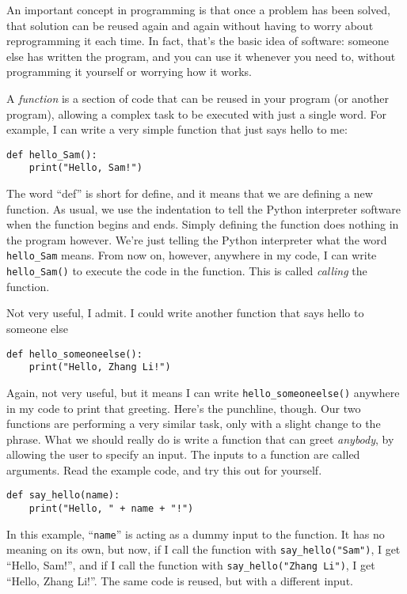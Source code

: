 \documentclass[a4paper]{article}
\begin{document}
An important concept in programming is that once a problem has been solved, that solution can be reused again and again without having to worry about reprogramming it each time. In fact, that's the basic idea of software: someone else has written the program, and you can use it whenever you need to, without programming it yourself or worrying how it works.

A \emph{function} is a section of code that can be reused in your program (or another program), allowing a complex task to be executed with just a single word. For example, I can write a very simple function that just says hello to me:
\begin{lstlisting}
def hello_Sam():
    print("Hello, Sam!")
\end{lstlisting}
The word ``def'' is short for define, and it means that we are defining a new function. As usual, we use the indentation to tell the Python interpreter software when the function begins and ends. Simply defining the function does nothing in the program however. We're just telling the Python interpreter what the word \verb|hello_Sam| means. From now on, however, anywhere in my code, I can write \verb|hello_Sam()| to execute the code in the function. This is called \emph{calling} the function.

Not very useful, I admit. I could write another function that says hello to someone else
\begin{lstlisting}
def hello_someoneelse():
    print("Hello, Zhang Li!")
\end{lstlisting}
\noindent Again, not very useful, but it means I can write \verb|hello_someoneelse()| anywhere in my code to print that greeting. Here's the punchline, though. Our two functions are performing a very similar task, only with a slight change to the phrase. What we should really do is write a function that can greet \emph{anybody}, by allowing the user to specify an input. The inputs to a function are called arguments. Read the example code, and try this out for yourself.
\begin{lstlisting}
def say_hello(name):
    print("Hello, " + name + "!")
\end{lstlisting}
In this example, ``\verb|name|'' is acting as a dummy input to the function. It has no meaning on its own, but now, if I call the function with \verb|say_hello("Sam")|, I get ``Hello, Sam!'', and if I call the function with \verb|say_hello("Zhang Li")|, I get ``Hello, Zhang Li!''. The same code is reused, but with a different input. 
\end{document}

